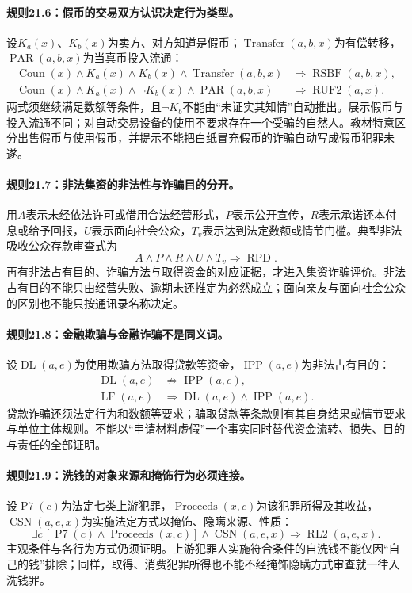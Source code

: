 \paragraph{规则21.6：假币的交易双方认识决定行为类型。}
设$K_a(x)$、$K_b(x)$为卖方、对方知道是假币；$\operatorname{Transfer}(a,b,x)$为有偿转移，$\operatorname{PAR}(a,b,x)$为当真币投入流通：
\[
\begin{aligned}
\operatorname{Coun}(x)\land K_a(x)\land K_b(x)
\land\operatorname{Transfer}(a,b,x)
&\Rightarrow\operatorname{RSBF}(a,b,x),\\
\operatorname{Coun}(x)\land K_a(x)\land\neg K_b(x)
\land\operatorname{PAR}(a,b,x)
&\Rightarrow\operatorname{RUF2}(a,x).
\end{aligned}
\]
两式须继续满足数额等条件，且$\neg K_b$不能由“未证实其知情”自动推出。展示假币与投入流通不同；对自动交易设备的使用不要求存在一个受骗的自然人。教材特意区分出售假币与使用假币，并提示不能把白纸冒充假币的诈骗自动写成假币犯罪未遂。

\paragraph{规则21.7：非法集资的非法性与诈骗目的分开。}
用$A$表示未经依法许可或借用合法经营形式，$P$表示公开宣传，$R$表示承诺还本付息或给予回报，$U$表示面向社会公众，$T_v$表示达到法定数额或情节门槛。典型非法吸收公众存款审查式为
\[
A\land P\land R\land U\land T_v
\Rightarrow\operatorname{RPD}.
\]
再有非法占有目的、诈骗方法与取得资金的对应证据，才进入集资诈骗评价。非法占有目的不能只由经营失败、逾期未还推定为必然成立；面向亲友与面向社会公众的区别也不能只按通讯录名称决定。

\paragraph{规则21.8：金融欺骗与金融诈骗不是同义词。}
设$\operatorname{DL}(a,e)$为使用欺骗方法取得贷款等资金，$\operatorname{IPP}(a,e)$为非法占有目的：
\[
\begin{aligned}
\operatorname{DL}(a,e)&\nRightarrow
\operatorname{IPP}(a,e),\\
\operatorname{LF}(a,e)&\Rightarrow
\operatorname{DL}(a,e)\land\operatorname{IPP}(a,e).
\end{aligned}
\]
贷款诈骗还须法定行为和数额等要求；骗取贷款等条款则有其自身结果或情节要求与单位主体规则。不能以“申请材料虚假”一个事实同时替代资金流转、损失、目的与责任的全部证明。

\paragraph{规则21.9：洗钱的对象来源和掩饰行为必须连接。}
设$\operatorname{P7}(c)$为法定七类上游犯罪，$\operatorname{Proceeds}(x,c)$为该犯罪所得及其收益，$\operatorname{CSN}(a,e,x)$为实施法定方式以掩饰、隐瞒来源、性质：
\[
\exists c\,[\operatorname{P7}(c)\land\operatorname{Proceeds}(x,c)]
\land\operatorname{CSN}(a,e,x)
\Rightarrow\operatorname{RL2}(a,e,x).
\]
主观条件与各行为方式仍须证明。上游犯罪人实施符合条件的自洗钱不能仅因“自己的钱”排除；同样，取得、消费犯罪所得也不能不经掩饰隐瞒方式审查就一律入洗钱罪。

